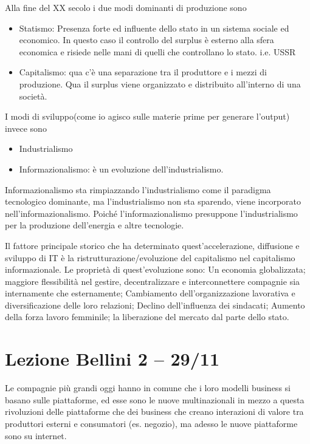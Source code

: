 \documentclass[a4page, 11pt]{article}
\begin{document}
Alla fine del XX secolo i due modi dominanti di produzione sono

\begin{itemize}
	 
	\item
	Statismo: Presenza forte ed influente dello stato in un sistema
	sociale ed economico. In questo caso il controllo del surplus è
	esterno alla sfera economica e risiede nelle mani di quelli che
	controllano lo stato. i.e. USSR
	\item
	Capitalismo: qua c'è una separazione tra il produttore e i mezzi di
	produzione. Qua il surplus viene organizzato e distribuito all'interno
	di una società.
\end{itemize}

I modi di sviluppo(come io agisco sulle materie prime per generare
l'output) invece sono

\begin{itemize}
	 
	\item
	Industrialismo
	\item
	Informazionalismo: è un evoluzione dell'industrialismo.
\end{itemize}

Informazionalismo sta rimpiazzando l'industrialismo come il paradigma
tecnologico dominante, ma l'industrialismo non sta sparendo, viene
incorporato nell'informazionalismo. Poiché l'informazionalismo
presuppone l'industrialismo per la produzione dell'energia e altre
tecnologie.

Il fattore principale storico che ha determinato quest'accelerazione,
diffusione e sviluppo di IT è la ristrutturazione/evoluzione del
capitalismo nel capitalismo informazionale. Le proprietà di
quest'evoluzione sono: Un economia globalizzata; maggiore flessibilità
nel gestire, decentralizzare e interconnettere compagnie sia
internamente che esternamente; Cambiamento dell'organizzazione
lavorativa e diversificazione delle loro relazioni; Declino
dell'influenza dei sindacati; Aumento della forza lavoro femminile; la
liberazione del mercato dal parte dello stato.
\section*{Lezione Bellini 2 -- 29/11}

Le compagnie più grandi oggi hanno in comune che i loro modelli business
si basano sulle piattaforme, ed esse sono le nuove multinazionali in
mezzo a questa rivoluzioni delle piattaforme che dei business che creano
interazioni di valore tra produttori esterni e consumatori (es.
negozio), ma adesso le nuove piattaforme sono su internet.
\end{document}
